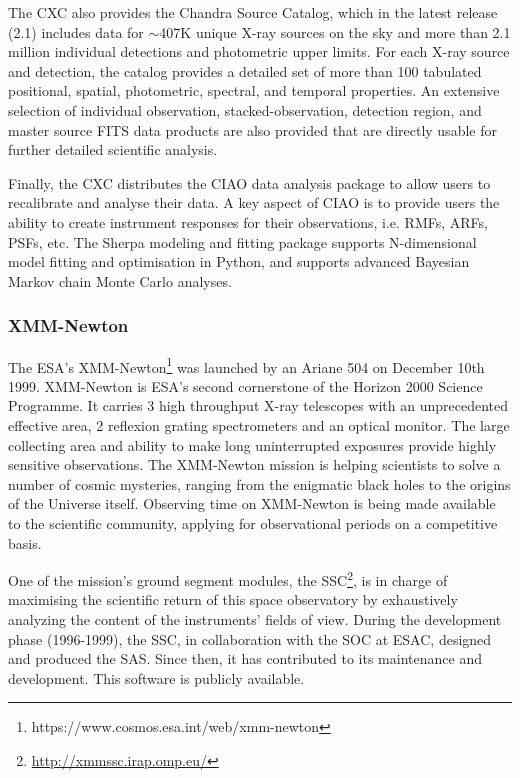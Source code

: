 \documentclass[11pt,a4paper]{ivoa}
\begin{document}
The \gls{CXC} also provides the Chandra Source Catalog, which in the latest release (2.1) includes data for $\sim$407K unique
X-ray sources on the sky and more than 2.1 million individual detections and photometric upper limits. For each X-ray
source and detection, the catalog provides a detailed set of more than 100 tabulated positional, spatial, photometric,
spectral, and temporal properties. An extensive selection of individual observation, stacked-observation, detection
region, and master source \gls{FITS} data products
are also provided that are directly usable for further detailed scientific analysis.

Finally, the \gls{CXC} distributes the CIAO data analysis package to allow users to recalibrate and analyse their data. A key
aspect of CIAO is to provide users the ability to create instrument responses for their
observations, i.e. \gls{RMF}s, \gls{ARF}s, \gls{PSF}s, etc. The Sherpa modeling and fitting package supports N-dimensional model fitting and optimisation in Python,
and supports advanced Bayesian Markov chain Monte Carlo analyses.

\subsubsection{XMM-Newton}

The \gls{ESA}'s \gls{XMM-Newton}\footnote{https://www.cosmos.esa.int/web/xmm-newton}
was launched by an Ariane 504 on December 10th 1999. \gls{XMM-Newton} is \gls{ESA}'s second cornerstone of the Horizon 2000 Science Programme.
It carries 3 high throughput X-ray telescopes with an unprecedented effective area, 2 reflexion grating spectrometers and an optical monitor.
The large collecting area and ability to make long uninterrupted exposures provide highly sensitive observations.
The \gls{XMM-Newton} mission is helping scientists to solve a number of cosmic mysteries, ranging from the enigmatic black holes
to the origins of the Universe itself. Observing time on \gls{XMM-Newton} is being made available to the scientific community,
applying for observational periods on a competitive basis.

One of the mission's ground segment modules, the \gls{SSC}\footnote{\url{http://xmmssc.irap.omp.eu/}}, is in charge of maximising the scientific return of
this space observatory by exhaustively analyzing
the content of the instruments' fields of view. During the development phase (1996-1999), the \gls{SSC},
in collaboration with the \gls{SOC} at \gls{ESAC}, designed and produced the \gls{SAS}.
Since then, it has contributed to its maintenance and development. This software is publicly available.
\end{document}
